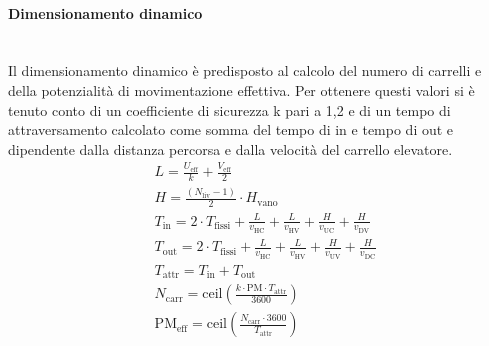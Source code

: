 \documentclass[11pt]{article}
\begin{document}
\paragraph{Dimensionamento dinamico}\mbox{}\\
Il dimensionamento dinamico è predisposto al calcolo del numero di carrelli e della potenzialità di movimentazione effettiva. Per ottenere questi valori si è tenuto conto di un coefficiente di sicurezza k pari a 1,2 e di un tempo di attraversamento calcolato come somma del tempo di in e tempo di out e dipendente dalla distanza percorsa e dalla velocità del carrello elevatore.
\begin{align}
    & L = \frac{U_\text{eff}}{k} + \frac{V_\text{eff}}{2} \\
    & H = \frac{(N_\text{liv} - 1)}{2} \cdot H_\text{vano} \\
    & T_\text{in} = 2 \cdot T_\text{fissi} + \frac{L}{v_\text{HC}} + \frac{L}{v_\text{HV}} + \frac{H}{v_\text{UC}} + \frac{H}{v_\text{DV}} \\
    & T_\text{out} = 2 \cdot T_\text{fissi} + \frac{L}{v_\text{HC}} + \frac{L}{v_\text{HV}} + \frac{H}{v_\text{UV}} + \frac{H}{v_\text{DC}} \\
    & T_\text{attr} = T_\text{in} + T_\text{out} \\
    & N_\text{carr} = \text{ceil}\left(\frac{k \cdot \text{PM} \cdot T_\text{attr}}{3600}\right) \\
    & \text{PM}_\text{eff} = \text{ceil}\left(\frac{N_\text{carr} \cdot 3600}{T_\text{attr}}\right)
\end{align}
\end{document}
